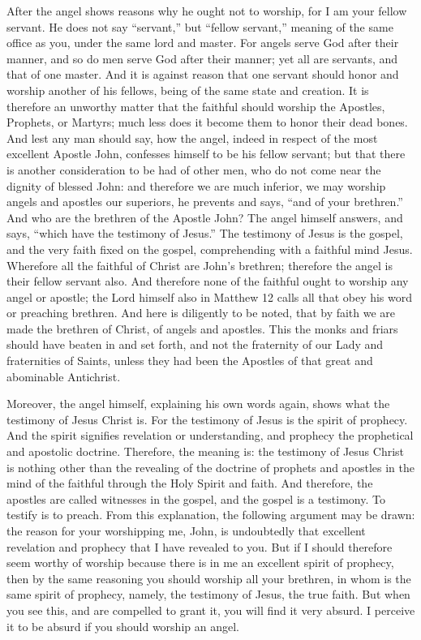 After the angel shows reasons why he ought not to worship, for I am your fellow servant. He does not say “servant,” but “fellow servant,” meaning of the same office as you, under the same lord and master. For angels serve God after their manner, and so do men serve God after their manner; yet all are servants, and that of one master. And it is against reason that one servant should honor and worship another of his fellows, being of the same state and creation. It is therefore an unworthy matter that the faithful should worship the Apostles, Prophets, or Martyrs; much less does it become them to honor their dead bones. And lest any man should say, how the angel, indeed in respect of the most excellent Apostle John, confesses himself to be his fellow servant; but that there is another consideration to be had of other men, who do not come near the dignity of blessed John: and therefore we are much inferior, we may worship angels and apostles our superiors, he prevents and says, “and of your brethren.” And who are the brethren of the Apostle John? The angel himself answers, and says, “which have the testimony of Jesus.” The testimony of Jesus is the gospel, and the very faith fixed on the gospel, comprehending with a faithful mind Jesus. Wherefore all the faithful of Christ are John’s brethren; therefore the angel is their fellow servant also. And therefore none of the faithful ought to worship any angel or apostle; the Lord himself also in Matthew 12 calls all that obey his word or preaching brethren. And here is diligently to be noted, that by faith we are made the brethren of Christ, of angels and apostles. This the monks and friars should have beaten in and set forth, and not the fraternity of our Lady and fraternities of Saints, unless they had been the Apostles of that great and abominable Antichrist.

Moreover, the angel himself, explaining his own words again, shows what the testimony of Jesus Christ is. For the testimony of Jesus is the spirit of prophecy. And the spirit signifies revelation or understanding, and prophecy the prophetical and apostolic doctrine. Therefore, the meaning is: the testimony of Jesus Christ is nothing other than the revealing of the doctrine of prophets and apostles in the mind of the faithful through the Holy Spirit and faith. And therefore, the apostles are called witnesses in the gospel, and the gospel is a testimony. To testify is to preach. From this explanation, the following argument may be drawn: the reason for your worshipping me, John, is undoubtedly that excellent revelation and prophecy that I have revealed to you. But if I should therefore seem worthy of worship because there is in me an excellent spirit of prophecy, then by the same reasoning you should worship all your brethren, in whom is the same spirit of prophecy, namely, the testimony of Jesus, the true faith. But when you see this, and are compelled to grant it, you will find it very absurd. I perceive it to be absurd if you should worship an angel.

